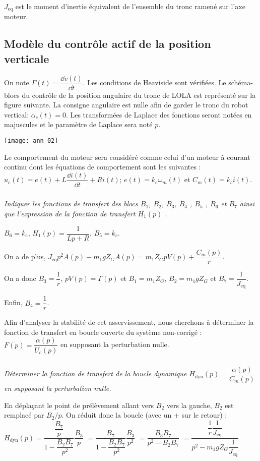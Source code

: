 \begin{multicols}{2}
$J_{\text{eq}}$ est le moment d'inertie équivalent de l'ensemble du tronc ramené sur l'axe moteur.
\fi


\subsection*{Modèle du contrôle actif de la position verticale}
\ifprof
\else
On note $\Gamma(t)=\dfrac{\dd v(t)}{\dd t }$. Les conditions de Heaviside sont vérifiées. Le schéma-blocs du contrôle de la position angulaire du tronc de LOLA est représenté sur la figure suivante. La consigne angulaire est nulle afin de garder le
tronc du robot vertical: $\alpha_c(t)=0$. Les transformées de Laplace des fonctions seront notées en majuscules et
le paramètre de Laplace sera noté $p$.

\begin{center}
\texttt{[image: ann\_02]}
\end{center}



Le comportement du moteur sera considéré comme celui d'un moteur à courant continu dont les équations de
comportement sont les suivantes : $u_c (t)=e(t)+L \dfrac{\dd i(t)}{\dd t} +Ri (t)$; $e(t)=k_e\omega_m(t)$ et $C_m( t)=k_c i(t)$.

\fi

\subparagraph{} \textit{Indiquer les fonctions de transfert des blocs $B_1$, $B_2$, $B_3$, $B_4$ , $B_5$ , $B_6$ et $B_7$ ainsi que l'expression de la fonction de transfert $H_1(p)$ .}
\ifprof
\begin{corrige}
$B_6 = k_e$, $H_1(p)=\dfrac{1}{Lp + R}$, $B_5 = k_c$. 

On a de plus, $J_{\text{eq}} p^2 A(p) -m_1gZ_GA(p)=m_1 Z_G p V(p) +\dfrac{C_m(p)}{r}$.

On a donc $B_3 = \dfrac{1}{r}$, $p V(p) = \Gamma(p)$ et $B_1 = m_1 Z_G$, $B_2 =m_1gZ_G$ et $B_7 = \dfrac{1}{J_{\text{eq}}}$.

Enfin, $B_4 = \dfrac{1}{r}$.

\end{corrige}
\else
\fi

\ifprof
\else
Afin d'analyser la stabilité de cet asservissement, nous cherchons à déterminer la fonction de transfert en
boucle ouverte du système non-corrigé : $ F(p)= \dfrac{\alpha (p)}{U_c (p)}$ en supposant la perturbation nulle.
\fi

\subparagraph{} \textit{Déterminer la fonction de transfert de la boucle dynamique $H_{\text{dyn}}(p)=\dfrac{\alpha (p)}{C_m(p)}$ en supposant la perturbation nulle.}
\ifprof
\begin{corrige}
En déplaçant le point de prélèvement allant vers $B_2$ vers la gauche, $B_2$ est remplacé par $B_2/p$. On réduit donc la boucle (avec un + sur le retour) : $H_{\text{dyn}}(p)=\dfrac{\dfrac{B_7}{p}}{1-\dfrac{B_2B_7}{p^2}}\dfrac{B_3}{p}$ $=\dfrac{B_7}{1-\dfrac{B_2B_7}{p^2}}\dfrac{B_3}{p^2}$
 $=\dfrac{B_3B_7}{p^2-B_2B_7}$
  $=\dfrac{\dfrac{1}{r}\dfrac{1}{J_{\text{eq}}}}{p^2-m_1gZ_G\dfrac{1}{J_{\text{eq}}}}$
  

\end{corrige}
\end{multicols}
